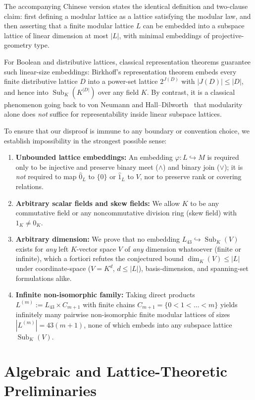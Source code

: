 \documentclass[11pt]{article}
\theoremstyle{definition}
\newcommand{\Sub}{\operatorname{Sub}}
\begin{document}
The accompanying Chinese version states the identical definition and two-clause claim:
first defining a modular lattice as a lattice satisfying the modular law, and then
asserting that a finite modular lattice $L$ can be embedded into a subspace lattice of
linear dimension at most $|L|$, with minimal embeddings of projective-geometry type.

For Boolean and distributive lattices, classical representation theorems guarantee such
linear-size embeddings: Birkhoff's representation theorem embeds every finite
distributive lattice $D$ into a power-set lattice $2^{J(D)}$ with $|J(D)| \le |D|$, and
hence into $\Sub_K(K^{|D|})$ over any field $K$. By contrast, it is a classical
phenomenon going back to von Neumann and Hall--Dilworth~\cite{HallDilworth1944} that
modularity alone does \emph{not} suffice for representability inside linear subspace
lattices.

To ensure that our disproof is immune to any boundary or convention choice, we establish
impossibility in the strongest possible sense:
\begin{enumerate}
  \item \textbf{Unbounded lattice embeddings:} An embedding $\varphi : L \hookrightarrow M$
  is required only to be injective and preserve binary meet ($\wedge$) and binary join
  ($\vee$); it is \emph{not} required to map $\hat{0}_L$ to $\{0\}$ or $\hat{1}_L$ to
  $V$, nor to preserve rank or covering relations.
  \item \textbf{Arbitrary scalar fields and skew fields:} We allow $K$ to be any
  commutative field or any noncommutative division ring (skew field) with $1_K \ne 0_K$.
  \item \textbf{Arbitrary dimension:} We prove that no embedding $L_{43} \hookrightarrow
  \Sub_K(V)$ exists for \emph{any} left $K$-vector space $V$ of \emph{any} dimension
  whatsoever (finite or infinite), which a fortiori refutes the conjectured bound
  $\dim_K(V) \le |L|$ under coordinate-space ($V = K^d$, $d \le |L|$), basis-dimension,
  and spanning-set formulations alike.
  \item \textbf{Infinite non-isomorphic family:} Taking direct products $L^{(m)} :=
  L_{43} \times C_{m+1}$ with finite chains $C_{m+1} = \{0 < 1 < \dots < m\}$ yields
  infinitely many pairwise non-isomorphic finite modular lattices of sizes
  $|L^{(m)}| = 43(m+1)$, none of which embeds into any subspace lattice $\Sub_K(V)$.
\end{enumerate}

\section{Algebraic and Lattice-Theoretic Preliminaries}
\end{document}
